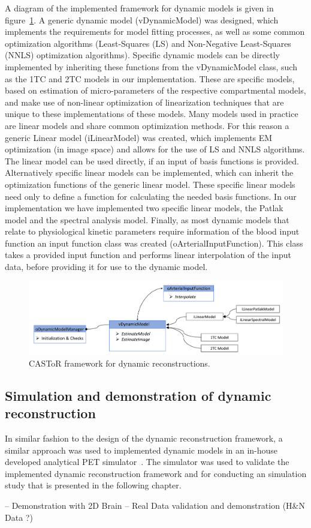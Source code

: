 A diagram of the implemented framework for dynamic models is given in figure~\ref{fig3_2:DynamicModelManager}. 
A generic dynamic model (vDynamicModel) was designed, which implements the requirements for model fitting processes, as well as some common optimization algorithms (Least-Squares (LS) and Non-Negative Least-Squares (NNLS) optimization algorithms).
Specific dynamic models can be directly implemented by inheriting these functions from the vDynamicModel class, such as the 1TC and 2TC models in our implementation. These are specific models, based on estimation of micro-parameters of the respective compartmental models, and make use of non-linear optimization of linearization techniques that are unique to these implementations of these models. 
Many models used in practice are linear models and share common optimization methods. For this reason a generic Linear model (iLinearModel) was created, which implements EM optimization (in image space) and allows for the use of LS and NNLS algorithms. The linear model can be used directly, if an input of basis functions is provided. Alternatively specific linear models can be implemented, which can inherit the optimization functions of the generic linear model. These specific linear models need only to define a function for calculating the needed basis functions. 
In our implementation we have implemented two specific linear models, the Patlak model and the spectral analysis model. 
Finally, as most dynamic models that relate to physiological kinetic parameters require information of the blood input function an input function class was created (oArterialInputFunction). This class takes a provided input function and performs linear interpolation of the input data, before providing it for use to the dynamic model. 

\begin{figure} [ht!]
\centering
\includegraphics[scale=0.5,angle=0]{3_Results/3_2_DWB_Reconstruction/figures/oDynamicModelManager.pdf}
\caption{CASToR framework for dynamic reconstructions.} 
\label{fig3_2:DynamicModelManager}
\end{figure}

\subsection{Simulation and demonstration of dynamic reconstruction}
In similar fashion to the design of the dynamic reconstruction framework, a similar approach was used to implemented dynamic models in an in-house developed analytical PET simulator~\cite{Stute2015}. 
The simulator was used to validate the implemented dynamic reconstruction framework and for conducting an simulation study that is presented in the following chapter.

-- Demonstration with 2D Brain
-- Real Data validation and demonstration (H\&N Data ?)